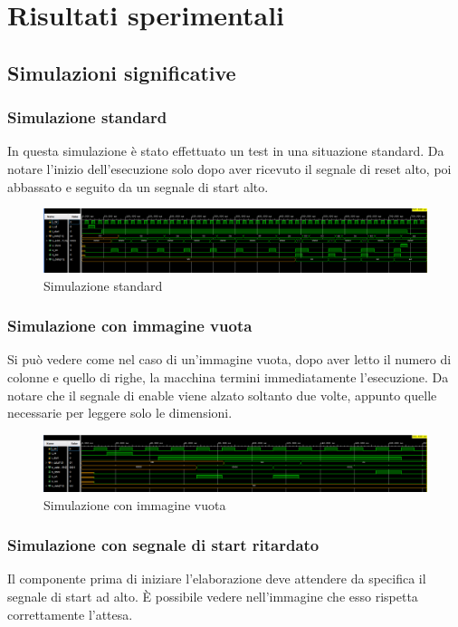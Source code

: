 \documentclass{article}
\begin{document}
\pagebreak
\section{Risultati sperimentali}

\subsection{Simulazioni significative}

\subsubsection{Simulazione standard}

In questa simulazione è stato effettuato un test in una situazione standard. Da notare l'inizio dell'esecuzione solo dopo aver ricevuto il segnale di reset alto, poi abbassato e seguito da un segnale di start alto.

\begin{figure}[h]
    \includegraphics[width=\textwidth]{test-standard.png}
    \centering
    \caption{Simulazione standard}
\end{figure}

\subsubsection{Simulazione con immagine vuota}
Si può vedere come nel caso di un'immagine vuota, dopo aver letto il numero di colonne e quello di righe, la macchina termini immediatamente l'esecuzione. Da notare che il segnale di enable viene alzato soltanto due volte, appunto quelle necessarie per leggere solo le dimensioni.

\begin{figure}[h]
    \includegraphics[width=\textwidth]{test-empty-image.png}
    \centering
    \caption{Simulazione con immagine vuota}
\end{figure}

\subsubsection{Simulazione con segnale di start ritardato}
Il componente prima di iniziare l'elaborazione deve attendere da specifica il segnale di start ad alto. È possibile vedere nell'immagine che esso rispetta correttamente l'attesa.
\end{document}
